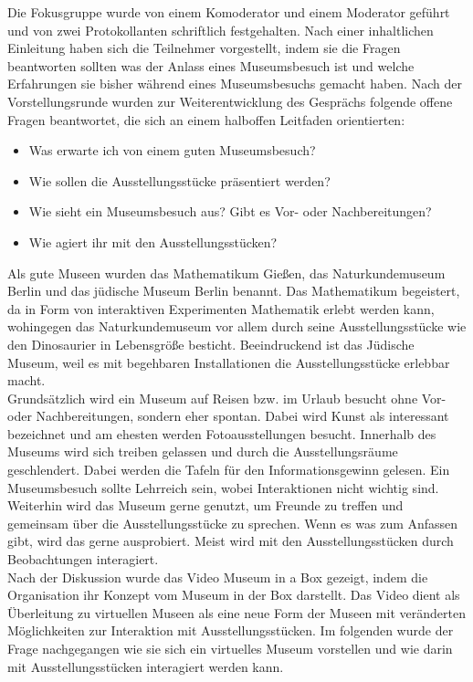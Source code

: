 \documentclass[runningheads,a4paper]{llncs}
\begin{document}
Die Fokusgruppe wurde von einem Komoderator und einem Moderator geführt und von zwei Protokollanten schriftlich festgehalten. Nach einer inhaltlichen Einleitung haben sich die Teilnehmer vorgestellt, indem sie die Fragen beantworten sollten was der Anlass eines Museumsbesuch ist und welche Erfahrungen sie bisher während eines Museumsbesuchs gemacht haben. Nach der Vorstellungsrunde wurden zur Weiterentwicklung des Gesprächs folgende offene Fragen beantwortet, die sich an einem halboffen Leitfaden orientierten:
\begin{itemize}
	\item Was erwarte ich von einem guten Museumsbesuch?
	\item Wie sollen die Ausstellungsstücke präsentiert werden?
	\item Wie sieht ein Museumsbesuch aus? Gibt es Vor- oder Nachbereitungen?
	\item Wie agiert ihr mit den Ausstellungsstücken?
\end{itemize}

Als gute Museen wurden das Mathematikum Gießen, das Naturkundemuseum Berlin und das jüdische Museum Berlin benannt. Das Mathematikum begeistert, da in Form von interaktiven Experimenten Mathematik erlebt werden kann, wohingegen das Naturkundemuseum vor allem durch seine Ausstellungsstücke wie den Dinosaurier in Lebensgröße besticht. Beeindruckend ist das Jüdische Museum, weil es mit begehbaren Installationen die Ausstellungsstücke erlebbar macht.\\

Grundsätzlich wird ein Museum auf Reisen bzw. im Urlaub besucht ohne Vor- oder Nachbereitungen, sondern eher spontan. Dabei wird Kunst als interessant bezeichnet und am ehesten werden Fotoausstellungen besucht. Innerhalb des Museums wird sich treiben gelassen und durch die Ausstellungsräume geschlendert. Dabei werden die Tafeln für den Informationsgewinn gelesen. Ein Museumsbesuch sollte Lehrreich sein, wobei Interaktionen nicht wichtig sind. Weiterhin wird das Museum gerne genutzt, um  Freunde zu treffen und gemeinsam über die Ausstellungsstücke zu sprechen. Wenn es was zum Anfassen gibt, wird das gerne ausprobiert. Meist wird mit den Ausstellungsstücken durch Beobachtungen interagiert.\\

Nach der Diskussion wurde das Video Museum in a Box gezeigt, indem die Organisation ihr Konzept vom Museum in der Box darstellt. Das Video dient als Überleitung zu virtuellen Museen als eine neue Form der Museen mit veränderten Möglichkeiten zur Interaktion mit Ausstellungsstücken. Im folgenden wurde der Frage nachgegangen wie sie sich ein virtuelles Museum vorstellen und wie darin mit Ausstellungsstücken interagiert werden kann.\\
\end{document}

